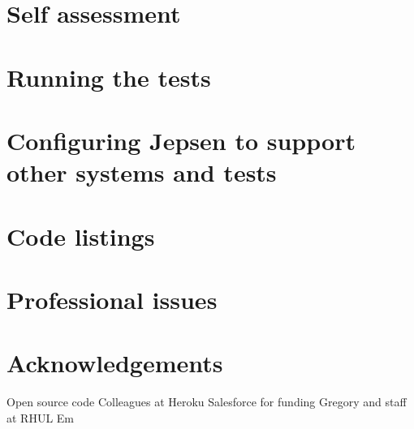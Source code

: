 \documentclass[11pt]{article} %
\theoremstyle{plain}
\theoremstyle{definition}
\begin{document}
\appendix
\section{Self assessment}
\section{Running the tests}
\section{Configuring Jepsen to support other systems and tests}
\section{Code listings}
\section{Professional issues}
\section{Acknowledgements}

Open source code
Colleagues at Heroku
Salesforce for funding
Gregory and staff at RHUL
Em
\end{document}
